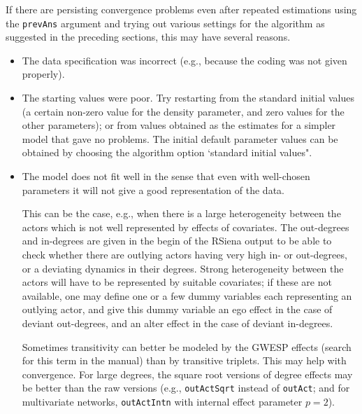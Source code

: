 \documentclass[a4paper,fleqn,11pt]{article}
\newcommand{\+}{\, + \,}
\newcommand{\RS}{{\sf \textsf{RSiena} }}
\begin{document}
If there are persisting convergence problems even after repeated estimations
using the \texttt{prevAns} argument and trying out various
settings for the algorithm as suggested in the preceding sections,
this may have several reasons.
\begin{itemize}
\item The data specification was incorrect (e.g., because the coding
      was not given properly).
\item The starting values were poor.
      Try restarting from the standard initial values
      (a certain non-zero value for the
      density parameter, and zero values for the other parameters);
      or from values obtained as the estimates for a simpler model
      that gave no problems.
      The initial default parameter values can be obtained
      by choosing the algorithm option `standard initial values".

\item The model does not fit well in the sense that even with well-chosen
      parameters it will not give a good representation of the data.

      This can be the case, e.g., when there is a large heterogeneity
      between the actors which is not well represented by effects
      of covariates.
      The out-degrees and in-degrees are given in the begin of the \RS output
      to be able to check whether there are outlying actors having very high
      in- or out-degrees, or a deviating dynamics in their degrees.
      Strong heterogeneity between the actors will have to be
      represented by suitable covariates; if these are not available,
      one may define one or a few dummy variables each representing
      an outlying actor, and give this dummy variable an ego effect
      in the case of deviant out-degrees, and an alter effect in the
      case of deviant in-degrees.

      Sometimes transitivity can better be modeled by the GWESP effects
      (search for this term in the manual) than by transitive triplets.
      This may help with convergence.
      For large degrees, the square root versions of degree effects
      may be better than the raw versions (e.g., \texttt{outActSqrt}
      instead of \texttt{outAct}; and for multivariate networks,
      \texttt{outActIntn} with internal effect parameter $p=2$).


\end{itemize}
\end{document}
